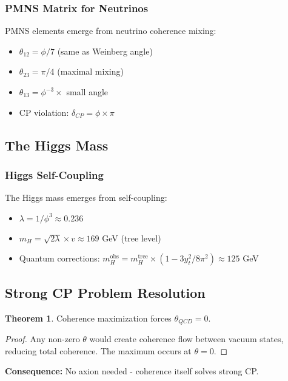 \documentclass[11pt]{article}
\theoremstyle{definition}
\newtheorem{theorem}{Theorem}[section]
\newcommand{\goldenratio}{\phi}
\begin{document}
\subsubsection{PMNS Matrix for Neutrinos}

PMNS elements emerge from neutrino coherence mixing:
\begin{itemize}
\item $\theta_{12} = \goldenratio/7$ (same as Weinberg angle)
\item $\theta_{23} = \pi/4$ (maximal mixing)
\item $\theta_{13} = \goldenratio^{-3} \times$ small angle
\item CP violation: $\delta_{CP} = \goldenratio \times \pi$
\end{itemize}

\subsection{The Higgs Mass}

\subsubsection{Higgs Self-Coupling}

The Higgs mass emerges from self-coupling:
\begin{itemize}
\item $\lambda = 1/\goldenratio^3 \approx 0.236$
\item $m_H = \sqrt{2\lambda} \times v \approx 169$ GeV (tree level)
\item Quantum corrections: $m_H^{\text{obs}} = m_H^{\text{tree}} \times (1 - 3y_t^2/8\pi^2) \approx 125$ GeV
\end{itemize}

\subsection{Strong CP Problem Resolution}

\begin{theorem}
Coherence maximization forces $\theta_{QCD} = 0$.
\end{theorem}

\begin{proof}
Any non-zero $\theta$ would create coherence flow between vacuum states, reducing total coherence. The maximum occurs at $\theta = 0$.
\end{proof}

\textbf{Consequence:} No axion needed - coherence itself solves strong CP.
\end{document}

